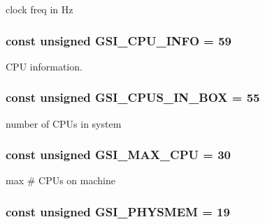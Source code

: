 clock freq in Hz \hypertarget{classAlphaTru64_ad89f91e0925845385f177d93e4ef7985}{
\subsubsection[{GSI\_\-CPU\_\-INFO}]{\setlength{\rightskip}{0pt plus 5cm}const unsigned {\bf GSI\_\-CPU\_\-INFO} = 59}}
\label{classAlphaTru64_ad89f91e0925845385f177d93e4ef7985}


CPU information. \hypertarget{classAlphaTru64_a4df912c77419619f6f242873f65b0045}{
\subsubsection[{GSI\_\-CPUS\_\-IN\_\-BOX}]{\setlength{\rightskip}{0pt plus 5cm}const unsigned {\bf GSI\_\-CPUS\_\-IN\_\-BOX} = 55}}
\label{classAlphaTru64_a4df912c77419619f6f242873f65b0045}


number of CPUs in system \hypertarget{classAlphaTru64_a14ed8f49156face38fb0dee35125148d}{
\subsubsection[{GSI\_\-MAX\_\-CPU}]{\setlength{\rightskip}{0pt plus 5cm}const unsigned {\bf GSI\_\-MAX\_\-CPU} = 30}}
\label{classAlphaTru64_a14ed8f49156face38fb0dee35125148d}


max \# CPUs on machine \hypertarget{classAlphaTru64_a2c859016d59653914527bcd85a154da4}{
\subsubsection[{GSI\_\-PHYSMEM}]{\setlength{\rightskip}{0pt plus 5cm}const unsigned {\bf GSI\_\-PHYSMEM} = 19}}
\label{classAlphaTru64_a2c859016d59653914527bcd85a154da4}


